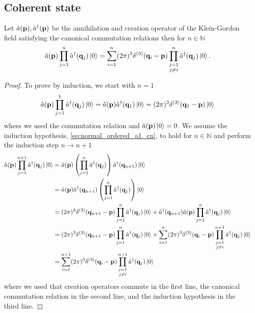 \subsection{Coherent state}

\begin{lemma}\label{th:normal_ordered_a1_cn}
	Let $\hat{a}(\vb{p}),\hat{a}^\dagger(\vb{p})$ be the annihilation and creation operator of the Klein-Gordon field satisfying the canonical commutation relations then for $n\in\mathbb{N}$
	\begin{equation}
		\hat{a}(\vb{p})
		\prod_{j=1}^n
		\hat{a}^\dagger(\vb{q}_j)
		\ket{0}
		=
		\sum_{i=1}^n
		(2\pi)^3
		\delta^{(3)}(\vb{q}_i-\vb{p})
		\prod_{\substack{j=1\\j\neq i}}^n
		\hat{a}^\dagger(\vb{q}_j)
		\ket{0}
		\label{eq:normal_ordered_a1_cn}
		.
	\end{equation}
\end{lemma}
\begin{proof}
	To prove by induction, we start with $n=1$
	\begin{equation*}
		\hat{a}(\vb{p})
		\prod_{j=1}^1
		\hat{a}^\dagger(\vb{q}_j)
		\ket{0}
		=
		\hat{a}(\vb{p})
		\hat{a}^\dagger(\vb{q}_1)
		\ket{0}
		=
		(2\pi)^3
		\delta^{(3)}(\vb{q}_1-\vb{p})
		\ket{0}
	\end{equation*}
	where we used the commutation relation and $\hat{a}(\vb{p})\ket{0}=0$.
	We assume the induction hypothesis, \cref{eq:normal_ordered_a1_cn}, to hold for $n\in\mathbb{N}$ and perform the induction step $n\to n+1$
	\begin{equation*}
		\begin{split}
			\hat{a}(\vb{p})
			\prod_{j=1}^{n+1}
			\hat{a}^\dagger(\vb{q}_j)
			\ket{0}
			&=
			\hat{a}(\vb{p})
			\left(
				\prod_{j=1}^n
				\hat{a}^\dagger(\vb{q}_j)
			\right)
			\hat{a}^\dagger(\vb{q}_{n+1})
			\ket{0}
			\\
			&=
			\hat{a}(\vb{p})
			\hat{a}^\dagger(\vb{q}_{n+1})
			\left(
				\prod_{j=1}^n
				\hat{a}^\dagger(\vb{q}_j)
			\right)
			\ket{0}
			\\
			&=
			(2\pi)^3
			\delta^{(3)}(\vb{q}_{n+1}-\vb{p})
			\prod_{j=1}^n
			\hat{a}^\dagger(\vb{q}_j)
			\ket{0}
			+
			\hat{a}^\dagger(\vb{q}_{n+1})
			\hat{a}(\vb{p})
			\prod_{j=1}^n
			\hat{a}^\dagger(\vb{q}_j)
			\ket{0}
			\\
			&=
			(2\pi)^3
			\delta^{(3)}(\vb{q}_{n+1}-\vb{p})
			\prod_{j=1}^n
			\hat{a}^\dagger(\vb{q}_j)
			\ket{0}
			+
			\sum_{i=1}^n
			(2\pi)^3
			\delta^{(3)}(\vb{q}_i-\vb{p})
			\prod_{\substack{j=1\\j\neq i}}^{n+1}
			\hat{a}^\dagger(\vb{q}_j)
			\ket{0}
			\\
			&=
			\sum_{i=1}^{n+1}
			(2\pi)^3
			\delta^{(3)}(\vb{q}_i-\vb{p})
			\prod_{\substack{j=1\\j\neq i}}^{n+1}
			\hat{a}^\dagger(\vb{q}_j)
			\ket{0}
		\end{split}
	\end{equation*}
	where we used that creation operators commute in the first line, the canonical commutation relation in the second line, and the induction hypothesis in the third line.
\end{proof}

